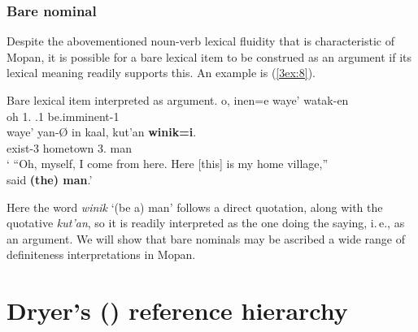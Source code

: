 \documentclass[output=paper]{langsci/langscibook}
\begin{document}
 
\subsubsection{Bare nominal}\label{3sec:214} 

Despite the abovementioned noun-verb lexical fluidity that is characteristic of Mopan, it is possible for a bare lexical item to be construed as an argument if its lexical meaning readily supports this.  An example is (\ref{3ex:8}).

\begin{samepage}
\begin{exe}
\ex\label{3ex:8}
Bare lexical item interpreted as argument. 
\exi{}
\gll	o,	inen=e			waye'		watak-en \\
	oh	1.{}	{}.1	be.imminent-1{} \\
\glt
\exi{}
\gll	waye'		yan-Ø		in		kaal,			kut'an		{\bf{winik=i}}. \\
	{}	exist-3{}	{}	hometown		3.{}	man{} \\
\glt 
` ``Oh, myself, I come from here. Here [this] is my home village,''\\said {\bf{(the) man}}.'
\end{exe}
\end{samepage}

Here the word {\emph{winik}} `(be a) man' follows a direct quotation, along with the quotative {\emph{kut'an}}, so it is readily interpreted as the one doing the saying, i.\,e., as an argument. We will show that bare nominals may be ascribed a wide range of definiteness interpretations in Mopan.


\section{Dryer's (\citeyear{dryer:14}) reference hierarchy}\label{3sec:3}
\end{document}
